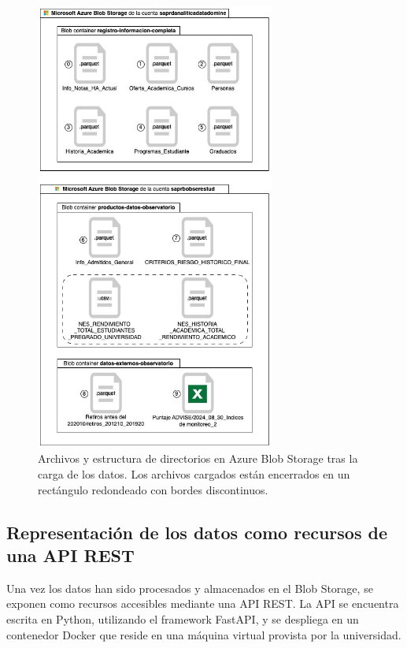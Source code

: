 \begin{figure}[h]
	\centering
	\includegraphics[width=0.7\textwidth]{img/blob_storage_post.jpg}
	\caption{Archivos y estructura de directorios en Azure Blob Storage tras la carga de los datos. Los archivos cargados están encerrados en un rectángulo redondeado con bordes discontinuos.}
	\label{fig:blob_storage_post}
\end{figure}

\subsection{Representación de los datos como recursos de una API REST}

Una vez los datos han sido procesados y almacenados en el Blob Storage, se exponen como recursos accesibles mediante una \gls{API REST}. La \gls{API} se encuentra escrita en Python, utilizando el framework FastAPI, y se despliega en un contenedor Docker que reside en una máquina virtual provista por la universidad.

